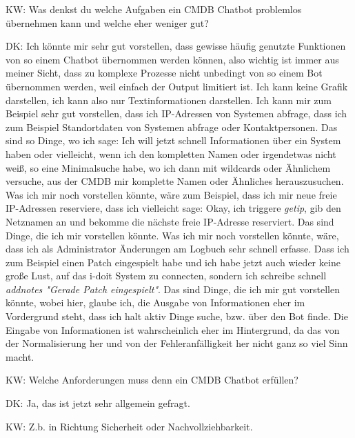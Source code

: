 \begin{list}{X:}{\setlength{\labelsep}{5mm}}
\item[KW:] Was denkst du welche Aufgaben ein CMDB Chatbot problemlos übernehmen kann und welche eher weniger gut?
\item[DK:] Ich könnte mir sehr gut vorstellen, dass gewisse häufig genutzte Funktionen von so einem Chatbot übernommen werden können, also wichtig ist immer aus meiner Sicht, dass zu komplexe Prozesse nicht unbedingt von so einem Bot übernommen werden, weil einfach der Output limitiert ist. Ich kann keine Grafik darstellen, ich kann also nur Textinformationen darstellen. Ich kann mir zum Beispiel sehr gut vorstellen, dass ich IP-Adressen von Systemen abfrage, dass ich zum Beispiel Standortdaten von Systemen abfrage oder Kontaktpersonen. Das sind so Dinge, wo ich sage: Ich will jetzt schnell Informationen über ein System haben oder vielleicht, wenn ich den kompletten Namen oder irgendetwas nicht weiß, so eine Minimalsuche habe, wo ich dann mit wildcards oder Ähnlichem versuche, aus der CMDB mir komplette Namen oder Ähnliches herauszusuchen. Was ich mir noch vorstellen könnte, wäre zum Beispiel, dass ich mir neue freie IP-Adressen reserviere, dass ich vielleicht sage: Okay, ich triggere \textit{getip}, gib den Netznamen an und bekomme die nächste freie IP-Adresse reserviert. Das sind Dinge, die ich mir vorstellen könnte. Was ich mir noch vorstellen könnte, wäre, dass ich als Administrator Änderungen am Logbuch sehr schnell erfasse. Dass ich zum Beispiel einen Patch eingespielt habe und ich habe jetzt auch wieder keine große Lust, auf das i-doit System zu connecten, sondern ich schreibe schnell \textit{addnotes "Gerade Patch eingespielt"}. Das sind Dinge, die ich mir gut vorstellen könnte, wobei hier, glaube ich, die Ausgabe von Informationen eher im Vordergrund steht, dass ich halt aktiv Dinge suche, bzw. über den Bot finde. Die Eingabe von Informationen ist wahrscheinlich eher im Hintergrund, da das von der Normalisierung her und von der Fehleranfälligkeit her nicht ganz so viel Sinn macht.
\item[KW:] Welche Anforderungen muss denn ein CMDB Chatbot erfüllen?
\item[DK:] Ja, das ist jetzt sehr allgemein gefragt.
\item[KW:] Z.b. in Richtung Sicherheit oder Nachvollziehbarkeit.

\end{list}
